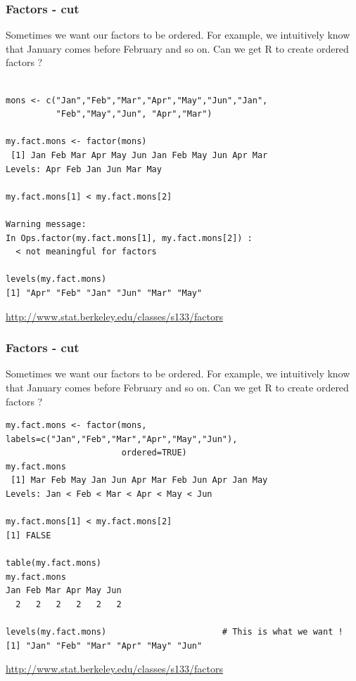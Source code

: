 \documentclass{beamer}
\begin{document}
%

\begin{frame}[fragile]
\frametitle{Factors - cut}
Sometimes we want our factors to be ordered. For example, we intuitively know that January comes before February and so on. Can we get R to create ordered factors ? 
\footnotesize
\begin{verbatim}

mons <- c("Jan","Feb","Mar","Apr","May","Jun","Jan",
          "Feb","May","Jun", "Apr","Mar")

my.fact.mons <- factor(mons)
 [1] Jan Feb Mar Apr May Jun Jan Feb May Jun Apr Mar
Levels: Apr Feb Jan Jun Mar May

my.fact.mons[1] < my.fact.mons[2]

Warning message:
In Ops.factor(my.fact.mons[1], my.fact.mons[2]) :
  < not meaningful for factors

levels(my.fact.mons)
[1] "Apr" "Feb" "Jan" "Jun" "Mar" "May"
\end{verbatim}
\scriptsize
\begin{center}
\url{http://www.stat.berkeley.edu/classes/s133/factors}
\end{center}
\end{frame}


%

\begin{frame}[fragile]
\frametitle{Factors - cut}
Sometimes we want our factors to be ordered. For example, we intuitively know that January comes before February and so on. Can we get R to create ordered factors ? 
\footnotesize
\begin{verbatim}
my.fact.mons <- factor(mons, labels=c("Jan","Feb","Mar","Apr","May","Jun"),
                       ordered=TRUE)
my.fact.mons
 [1] Mar Feb May Jan Jun Apr Mar Feb Jun Apr Jan May
Levels: Jan < Feb < Mar < Apr < May < Jun

my.fact.mons[1] < my.fact.mons[2]
[1] FALSE

table(my.fact.mons)
my.fact.mons
Jan Feb Mar Apr May Jun 
  2   2   2   2   2   2 

levels(my.fact.mons)                       # This is what we want !
[1] "Jan" "Feb" "Mar" "Apr" "May" "Jun"
\end{verbatim}
\scriptsize
\begin{center}
\url{http://www.stat.berkeley.edu/classes/s133/factors}
\end{center}
\end{frame}


%
\end{document}
